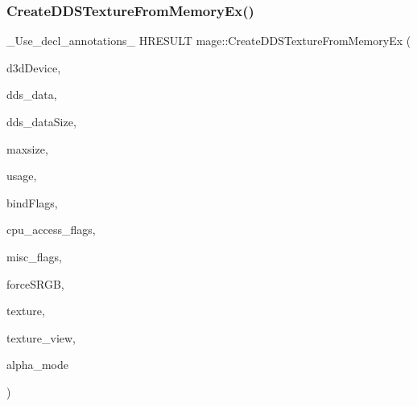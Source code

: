 \subsubsection{\texorpdfstring{Create\+D\+D\+S\+Texture\+From\+Memory\+Ex()}{CreateDDSTextureFromMemoryEx()}\hspace{0.1cm}{\footnotesize\ttfamily [3/4]}}
{\footnotesize\ttfamily \+\_\+\+Use\+\_\+decl\+\_\+annotations\+\_\+ H\+R\+E\+S\+U\+LT mage\+::\+Create\+D\+D\+S\+Texture\+From\+Memory\+Ex (\begin{DoxyParamCaption}\item[{I\+D3\+D11\+Device $\ast$}]{d3d\+Device,  }\item[{const uint8\+\_\+t $\ast$}]{dds\+\_\+data,  }\item[{size\+\_\+t}]{dds\+\_\+data\+Size,  }\item[{size\+\_\+t}]{maxsize,  }\item[{D3\+D11\+\_\+\+U\+S\+A\+GE}]{usage,  }\item[{uint32\+\_\+t}]{bind\+Flags,  }\item[{uint32\+\_\+t}]{cpu\+\_\+access\+\_\+flags,  }\item[{uint32\+\_\+t}]{misc\+\_\+flags,  }\item[{bool}]{force\+S\+R\+GB,  }\item[{I\+D3\+D11\+Resource $\ast$$\ast$}]{texture,  }\item[{I\+D3\+D11\+Shader\+Resource\+View $\ast$$\ast$}]{texture\+\_\+view,  }\item[{\hyperlink{namespacemage_a0c586a2bad862f4858900ca121ca80c2}{D\+D\+S\+\_\+\+A\+L\+P\+H\+A\+\_\+\+M\+O\+DE} $\ast$}]{alpha\+\_\+mode }\end{DoxyParamCaption})}

\hypertarget{namespacemage_a9adc89795f8da4f15483e1a4ebe7533d}{}\label{namespacemage_a9adc89795f8da4f15483e1a4ebe7533d} 
